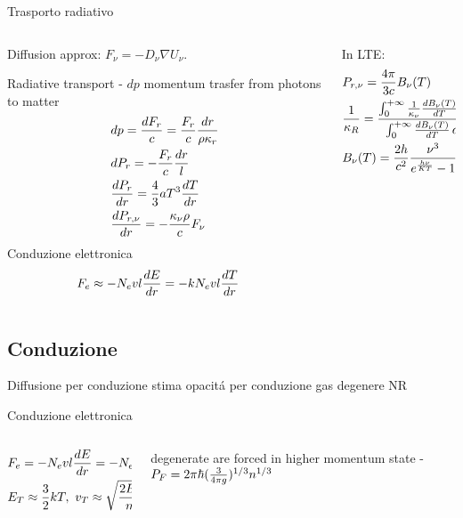 \begin{frame}{Trasporto radiativo}
\begin{columns}[T]
	\begin{column}{0.5\textwidth}
Diffusion approx: $F_{\nu}=-D_{\nu}\nabla U_{\nu}$.

Radiative transport - $dp$ momentum trasfer from photons to matter
\begin{align*}
&dp=\frac{dF_r}{c}=\frac{F_r}{c}\frac{dr}{\rho\kappa_r}\\
&dP_r=-\frac{F_r}{c}\frac{dr}{l}\\
&\TDy{r}{P_r}=\frac{4}{3}aT^3\TDy{r}{T}\\
&\TDy{r}{P_{r,\nu}}=-\frac{\kappa_{\nu}\rho}{c}F_{\nu}
\end{align*}
Conduzione elettronica
\begin{align*}
&F_e\approx-N_evl\TDy{r}{E}=-kN_evl\TDy{r}{T}
\end{align*}
\end{column}
\begin{column}{0.5\textwidth}
In LTE:
\begin{align*}
&P_{r,\nu}=\frac{4\pi}{3c}B_{\nu}(T)\\
&\frac{1}{\kappa_R}=\frac{\intzi{}\frac{1}{\kappa_{\nu}}\TDy{T}{B_{\nu}(T)}\,d\nu}{\intzi{}\TDy{T}{B_{\nu}(T)}\,d\nu}\\
&\plankfnu{}
\end{align*}
\end{column}
\end{columns}
\end{frame}

\subsection{Conduzione}

\begin{frame}{Diffusione per conduzione}
stima opacit\'a per conduzione gas degenere NR
\end{frame}

\begin{frame}{Conduzione elettronica}
\begin{columns}[T]
\begin{column}{0.5\textwidth}
	\begin{align*}
	&F_e=-N_evl\TDy{r}{E}=-N_ekvl\TDy{r}{T}\\
	&E_T\approx\frac{3}{2}kT,\ v_T\approx\sqrt{\frac{2E_T}{m}}
	\end{align*}
\end{column}
\begin{column}{0.5\textwidth}
	\Pelectron degenerate are forced in higher momentum state - $P_F=2\pi\hbar(\frac{3}{4\pi g})\expy{1/3}n\expy{1/3}$
\end{column}
\end{columns}
\end{frame}


